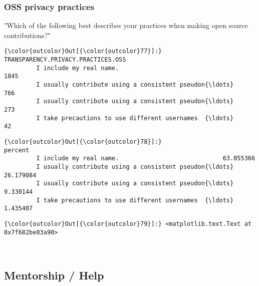 \documentclass[11pt]{article}
\begin{document}
    \subsubsection{OSS privacy practices}\label{oss-privacy-practices}

"Which of the following best describes your practices when making open
source contributions?"


            \begin{Verbatim}[commandchars=\\\{\}]
{\color{outcolor}Out[{\color{outcolor}77}]:}                                                     TRANSPARENCY.PRIVACY.PRACTICES.OSS
         I include my real name.                                                           1845
         I usually contribute using a consistent pseudon{\ldots}                                 766
         I usually contribute using a consistent pseudon{\ldots}                                 273
         I take precautions to use different usernames  {\ldots}                                  42
\end{Verbatim}
        

            \begin{Verbatim}[commandchars=\\\{\}]
{\color{outcolor}Out[{\color{outcolor}78}]:}                                                       percent
         I include my real name.                             63.055366
         I usually contribute using a consistent pseudon{\ldots}  26.179084
         I usually contribute using a consistent pseudon{\ldots}   9.330144
         I take precautions to use different usernames  {\ldots}   1.435407
\end{Verbatim}
        

            \begin{Verbatim}[commandchars=\\\{\}]
{\color{outcolor}Out[{\color{outcolor}79}]:} <matplotlib.text.Text at 0x7f682be03a90>
\end{Verbatim}
        
    \begin{center}
    \end{center}
    { \hspace*{\fill} \\}
    
    \subsection{Mentorship / Help}\label{mentorship-help}
\end{document}
